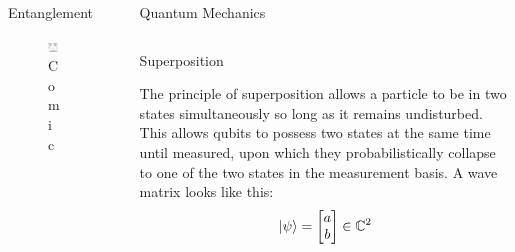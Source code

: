 \documentclass[final, 20pt]{beamer}
\newlength{\sepwid}
\newlength{\onecolwid}
\newlength{\twocolwid}
\begin{document}
\begin{frame}[t]
\begin{columns}[t]
\begin{column}{\onecolwid}
\begin{block}{Entanglement}
\end{block}

\begin{figure}
\includegraphics[width=0.55\linewidth]{comic.png}
\caption{Comic}
\end{figure}

\end{column} %

\begin{column}{\sepwid}\end{column} %

\begin{column}{\twocolwid} %

\begin{block}{Quantum Mechanics}
\end{block} 

\begin{columns}[t,totalwidth=\twocolwid] %

\begin{column}{\onecolwid}\vspace{-.6in} %


\begin{block}{Superposition}

The principle of superposition allows a particle to be in two states simultaneously so long as it remains undisturbed. This allows qubits to possess two states at the same time until measured, upon which they probabilistically collapse to one of the two states in the measurement basis.
A wave matrix looks like this:
\begin{equation}
	\ket{\psi} = \begin{bmatrix} a \\ b \\ 
	\end{bmatrix} \in \mathbb{C}^2
\end{equation}


\end{block}
\end{column}
\end{columns}
\end{column}
\end{columns}
\end{frame}
\end{document}
